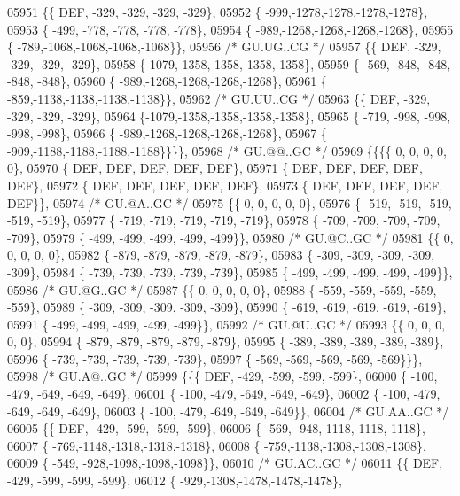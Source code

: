 \begin{DoxyCode}
05951 \{\{  DEF, -329, -329, -329, -329\},
05952 \{ -999,-1278,-1278,-1278,-1278\},
05953 \{ -499, -778, -778, -778, -778\},
05954 \{ -989,-1268,-1268,-1268,-1268\},
05955 \{ -789,-1068,-1068,-1068,-1068\}\},
05956 \textcolor{comment}{/* GU.UG..CG */}
05957 \{\{  DEF, -329, -329, -329, -329\},
05958 \{-1079,-1358,-1358,-1358,-1358\},
05959 \{ -569, -848, -848, -848, -848\},
05960 \{ -989,-1268,-1268,-1268,-1268\},
05961 \{ -859,-1138,-1138,-1138,-1138\}\},
05962 \textcolor{comment}{/* GU.UU..CG */}
05963 \{\{  DEF, -329, -329, -329, -329\},
05964 \{-1079,-1358,-1358,-1358,-1358\},
05965 \{ -719, -998, -998, -998, -998\},
05966 \{ -989,-1268,-1268,-1268,-1268\},
05967 \{ -909,-1188,-1188,-1188,-1188\}\}\}\},
05968 \textcolor{comment}{/* GU.@@..GC */}
05969 \{\{\{\{    0,    0,    0,    0,    0\},
05970 \{  DEF,  DEF,  DEF,  DEF,  DEF\},
05971 \{  DEF,  DEF,  DEF,  DEF,  DEF\},
05972 \{  DEF,  DEF,  DEF,  DEF,  DEF\},
05973 \{  DEF,  DEF,  DEF,  DEF,  DEF\}\},
05974 \textcolor{comment}{/* GU.@A..GC */}
05975 \{\{    0,    0,    0,    0,    0\},
05976 \{ -519, -519, -519, -519, -519\},
05977 \{ -719, -719, -719, -719, -719\},
05978 \{ -709, -709, -709, -709, -709\},
05979 \{ -499, -499, -499, -499, -499\}\},
05980 \textcolor{comment}{/* GU.@C..GC */}
05981 \{\{    0,    0,    0,    0,    0\},
05982 \{ -879, -879, -879, -879, -879\},
05983 \{ -309, -309, -309, -309, -309\},
05984 \{ -739, -739, -739, -739, -739\},
05985 \{ -499, -499, -499, -499, -499\}\},
05986 \textcolor{comment}{/* GU.@G..GC */}
05987 \{\{    0,    0,    0,    0,    0\},
05988 \{ -559, -559, -559, -559, -559\},
05989 \{ -309, -309, -309, -309, -309\},
05990 \{ -619, -619, -619, -619, -619\},
05991 \{ -499, -499, -499, -499, -499\}\},
05992 \textcolor{comment}{/* GU.@U..GC */}
05993 \{\{    0,    0,    0,    0,    0\},
05994 \{ -879, -879, -879, -879, -879\},
05995 \{ -389, -389, -389, -389, -389\},
05996 \{ -739, -739, -739, -739, -739\},
05997 \{ -569, -569, -569, -569, -569\}\}\},
05998 \textcolor{comment}{/* GU.A@..GC */}
05999 \{\{\{  DEF, -429, -599, -599, -599\},
06000 \{ -100, -479, -649, -649, -649\},
06001 \{ -100, -479, -649, -649, -649\},
06002 \{ -100, -479, -649, -649, -649\},
06003 \{ -100, -479, -649, -649, -649\}\},
06004 \textcolor{comment}{/* GU.AA..GC */}
06005 \{\{  DEF, -429, -599, -599, -599\},
06006 \{ -569, -948,-1118,-1118,-1118\},
06007 \{ -769,-1148,-1318,-1318,-1318\},
06008 \{ -759,-1138,-1308,-1308,-1308\},
06009 \{ -549, -928,-1098,-1098,-1098\}\},
06010 \textcolor{comment}{/* GU.AC..GC */}
06011 \{\{  DEF, -429, -599, -599, -599\},
06012 \{ -929,-1308,-1478,-1478,-1478\},

\end{DoxyCode}
